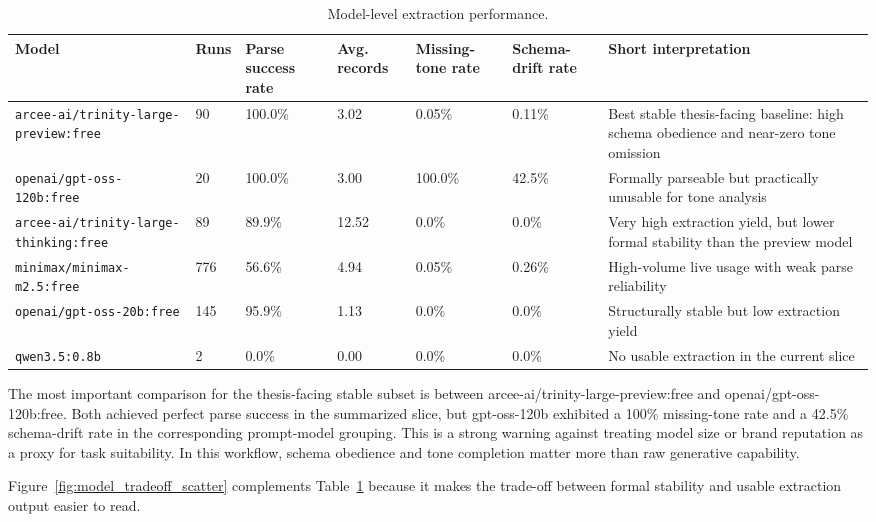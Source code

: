 \documentclass[english, online, cse, master]{dithesis}
\begin{document}
\begin{table}[htbp]
\centering
\caption{Model-level extraction performance.}
\label{tab:model-level-extraction-performance}
\footnotesize
\setlength{\tabcolsep}{4pt}
\renewcommand{\arraystretch}{1.15}
\begin{tabularx}{\linewidth}{|X|p{1.8cm}|X|p{1.8cm}|p{1.8cm}|p{1.8cm}|X|}
\hline
\textbf{Model} & \textbf{Runs} & \textbf{Parse success rate} & \textbf{Avg. records} & \textbf{Missing-tone rate} & \textbf{Schema-drift rate} & \textbf{Short interpretation} \\ \hline
\texttt{arcee-ai/trinity-large-preview:free} & 90 & 100.0\% & 3.02 & 0.05\% & 0.11\%  & Best stable thesis-facing baseline: high schema obedience and near-zero tone omission \\ \hline
\texttt{openai/gpt-oss-120b:free} & 20 & 100.0\% & 3.00 & 100.0\% & 42.5\%  & Formally parseable but practically unusable for tone analysis \\ \hline
\texttt{arcee-ai/trinity-large-thinking:free} & 89 & 89.9\% & 12.52 & 0.0\% & 0.0\%  & Very high extraction yield, but lower formal stability than the preview model \\ \hline
\texttt{minimax/minimax-m2.5:free} & 776 & 56.6\% & 4.94 & 0.05\% & 0.26\%  & High-volume live usage with weak parse reliability \\ \hline
\texttt{openai/gpt-oss-20b:free} & 145 & 95.9\% & 1.13 & 0.0\% & 0.0\%  & Structurally stable but low extraction yield \\ \hline
\texttt{qwen3.5:0.8b} & 2 & 0.0\% & 0.00 & 0.0\% & 0.0\%  & No usable extraction in the current slice \\ \hline
\end{tabularx}
\end{table}

The most important comparison for the thesis-facing stable subset is between arcee-ai/trinity-large-preview:free and openai/gpt-oss-120b:free. Both achieved perfect parse success in the summarized slice, but gpt-oss-120b exhibited a 100\% missing-tone rate and a 42.5\% schema-drift rate in the corresponding prompt-model grouping. This is a strong warning against treating model size or brand reputation as a proxy for task suitability. In this workflow, schema obedience and tone completion matter more than raw generative capability.

Figure~\ref{fig:model_tradeoff_scatter} complements Table~\ref{tab:model-level-extraction-performance} because it makes the trade-off between formal stability and usable extraction output easier to read.
\end{document}
